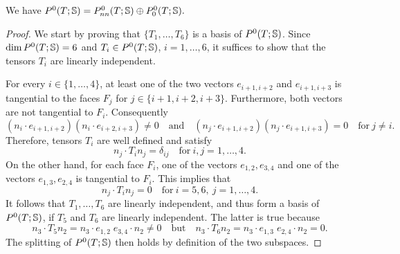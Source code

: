 \documentclass[11pt]{article}
\begin{document}
\begin{lemma} \label{la_SS} We have
\(
   P^0(T;\mathbb{S}) = P^0_{nn}(T;\mathbb{S}) \oplus P^0_0(T;\mathbb{S}).
\)
\end{lemma}

\begin{proof}
We start by proving that $\{T_1,\ldots,T_6\}$ is a basis of $P^0(T;\mathbb{S})$.
Since $\dim P^0(T;\mathbb{S})=6$ and $T_i\in P^0(T;\mathbb{S})$, $i=1,\ldots,6$, it suffices
to show that the tensors $T_i$ are linearly independent.

For every $i\in\{1,\ldots,4\}$,
at least one of the two vectors $e_{i+1,i+2}$ and $e_{i+1,i+3}$ is tangential to the faces
$F_j$ for $j\in\{i+1,i+2,i+3\}$. Furthermore, both vectors are not tangential to $F_i$.
Consequently
\[
   (n_i\cdot e_{i+1,i+2})(n_i\cdot e_{i+2,i+3})\not=0 \quad\text{and}\quad
   (n_j\cdot e_{i+1,i+2})(n_j\cdot e_{i+1,i+3})=0\quad \text{for}\ j\not=i.
\]
Therefore, tensors $T_i$ are well defined and satisfy
\[
   n_j\cdot T_i n_j=\delta_{ij}\quad\text{for}\ i,j=1,\ldots,4.
\]
On the other hand, for each face $F_i$, one of the vectors $e_{1,2},e_{3,4}$
and one of the vectors $e_{1,3},e_{2,4}$ is tangential to $F_i$.
This implies that
\[
   n_j\cdot T_i n_j=0\quad\text{for}\ i=5,6,\ j=1,\ldots,4.
\]
It follows that $T_1,\ldots,T_6$ are linearly independent, and thus form a basis
of $P^0(T;\mathbb{S})$, if $T_5$ and $T_6$ are linearly independent.
The latter is true because
\[
   n_3\cdot T_5 n_2 = n_3\cdot e_{1,2}\; e_{3,4}\cdot n_2\not=0
   \quad\text{but}\quad
   n_3\cdot T_6 n_2 = n_3\cdot e_{1,3}\; e_{2,4}\cdot n_2=0.
\]
The splitting of $P^0(T;\mathbb{S})$ then holds by definition of the two subspaces.
\end{proof}
\end{document}
